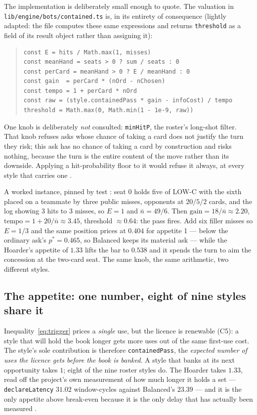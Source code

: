 \documentclass[11pt]{article}
\newcommand{\code}[1]{\texttt{#1}}
\begin{document}
The implementation is deliberately small enough to quote. The valuation in
\code{lib/engine/bots/contained.ts} is, in its entirety of consequence (lightly
adapted: the file computes these same expressions and returns \code{threshold}
as a field of its result object rather than assigning it):

\begin{quote}
\begin{verbatim}
const E = hits / Math.max(1, misses)
const meanHand = seats > 0 ? sum / seats : 0
const perCard = meanHand > 0 ? E / meanHand : 0
const gain  = perCard * (nOrd - nChosen)
const tempo = 1 + perCard * nOrd
const raw = (style.containedPass * gain - infoCost) / tempo
threshold = Math.max(0, Math.min(1 - 1e-9, raw))
\end{verbatim}
\end{quote}

One knob is deliberately \emph{not} consulted: \code{minHitP}, the roster's
long-shot filter. That knob refuses asks whose chance of taking a card does
not justify the turn they risk; this ask has no chance of taking a card by
construction and risks nothing, because the turn is the entire content of the
move rather than its downside. Applying a hit-probability floor to it would
refuse it always, at every style that carries one \cite{contained-ts}.

A worked instance, pinned by test \cite{tests-bots}: seat 0 holds five of
LOW-C with the sixth placed on a teammate by three public misses, opponents at
$20/5/2$ cards, and the log showing 3 hits to 3 misses, so $E = 1$ and
$\bar{n} = 49/6$. Then $\mathrm{gain} = 18/\bar n \approx 2.20$,
$\mathrm{tempo} = 1 + 20/\bar n \approx 3.45$, threshold $\approx 0.64$: the
pass fires. Add six filler misses so $E = 1/3$ and the same position prices at
$0.404$ for appetite 1 --- below the ordinary ask's $p^{*} = 0.465$, so
Balanced keeps its material ask --- while the Hoarder's appetite of $1.33$
lifts the bar to $0.538$ and it spends the turn to aim the concession at the
two-card seat. The same knob, the same arithmetic, two different styles.

\subsection{The appetite: one number, eight of nine styles share it}
\label{sec:appetite}

Inequality~\eqref{eq:trigger} prices a \emph{single} use, but the licence is
renewable (C5): a style that will hold the book longer gets more uses out of
the same first-use cost. The style's sole contribution is therefore
\code{containedPass}, the \emph{expected number of uses the licence gets
before the book is banked}. A style that banks at its next opportunity takes
$1$; eight of the nine roster styles do. The Hoarder takes $1.33$, read off
the project's own measurement of how much longer it holds a set ---
\code{declareLatency} $31.02$ window-cycles against Balanced's $23.39$ --- and
it is the only appetite above break-even because it is the only delay that has
actually been measured \cite{styles}.
\end{document}
